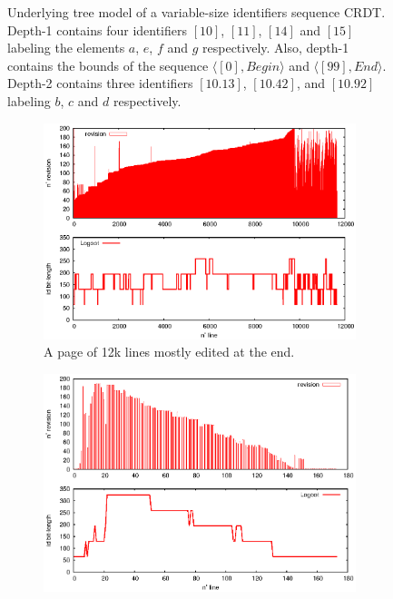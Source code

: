 \begin{figure}[h]
\begin{center}

\caption{Underlying tree model of a variable-size identifiers sequence CRDT.
  Depth-1 contains four identifiers $[10]$, $[11]$, $[14]$ and $[15]$ labeling
  the elements $a$, $e$, $f$ and $g$ respectively. Also, depth-1 contains the
  bounds of the sequence $\langle [0], Begin \rangle$ and $\langle [99],End
  \rangle$. Depth-2 contains three identifiers $[10.13]$, $[10.42]$, and
  $[10.92]$ labeling $b$, $c$ and $d$ respectively.  }
\label{fig:treeexample}
\end{center}
\end{figure}


\begin{figure}
\centering
\begin{subfigure}[t]{0.47\textwidth}
  \includegraphics[width=\textwidth]{img/compliant.eps}
  \caption{A page of 12k lines mostly edited at
    the end.}
  \label{im:posteonlyblue}
\end{subfigure}
\begin{subfigure}[t]{0.47\textwidth}
\includegraphics[width=\textwidth]{img/motivating.eps}

\end{subfigure}
\end{figure}

